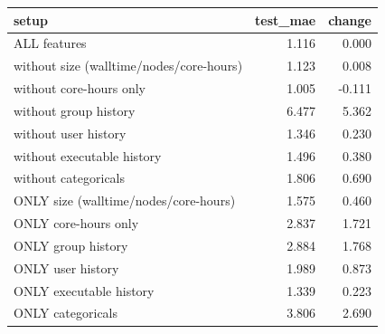 \begin{tabular}{lrr}
\toprule
setup & test_mae & change \\
\midrule
ALL features & 1.116 & 0.000 \\
without size (walltime/nodes/core-hours) & 1.123 & 0.008 \\
without core-hours only & 1.005 & -0.111 \\
without group history & 6.477 & 5.362 \\
without user history & 1.346 & 0.230 \\
without executable history & 1.496 & 0.380 \\
without categoricals & 1.806 & 0.690 \\
ONLY size (walltime/nodes/core-hours) & 1.575 & 0.460 \\
ONLY core-hours only & 2.837 & 1.721 \\
ONLY group history & 2.884 & 1.768 \\
ONLY user history & 1.989 & 0.873 \\
ONLY executable history & 1.339 & 0.223 \\
ONLY categoricals & 3.806 & 2.690 \\
\bottomrule
\end{tabular}
